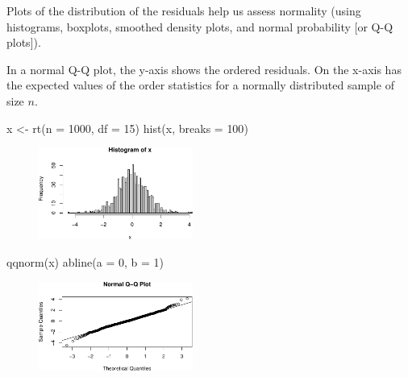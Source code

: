 \documentclass[
  letterpaper,
  DIV=11,
  numbers=noendperiod]{scrreport}
\newenvironment{Shaded}{\begin{snugshade}}{\end{snugshade}}
\newcommand{\AttributeTok}[1]{\textcolor[rgb]{0.40,0.45,0.13}{#1}}
\newcommand{\DecValTok}[1]{\textcolor[rgb]{0.68,0.00,0.00}{#1}}
\newcommand{\FunctionTok}[1]{\textcolor[rgb]{0.28,0.35,0.67}{#1}}
\newcommand{\NormalTok}[1]{\textcolor[rgb]{0.00,0.23,0.31}{#1}}
\newcommand{\OtherTok}[1]{\textcolor[rgb]{0.00,0.23,0.31}{#1}}
\begin{document}
Plots of the distribution of the residuals help us assess normality
(using histograms, boxplots, smoothed density plots, and normal
probability {[}or Q-Q plots{]}).

In a normal Q-Q plot, the y-axis shows the ordered residuals. On the
x-axis has the expected values of the order statistics for a normally
distributed sample of size \(n\).

\begin{Shaded}
\begin{Highlighting}[]
\NormalTok{x }\OtherTok{\textless{}{-}} \FunctionTok{rt}\NormalTok{(}\AttributeTok{n =} \DecValTok{1000}\NormalTok{, }\AttributeTok{df =} \DecValTok{15}\NormalTok{)}
\FunctionTok{hist}\NormalTok{(x, }\AttributeTok{breaks =} \DecValTok{100}\NormalTok{)}
\end{Highlighting}
\end{Shaded}

\begin{figure}[H]

{\centering \includegraphics[width=0.45\textwidth,height=\textheight]{week4/week4_files/figure-pdf/unnamed-chunk-3-1.pdf}

}

\end{figure}

\begin{Shaded}
\begin{Highlighting}[]
\FunctionTok{qqnorm}\NormalTok{(x)}
\FunctionTok{abline}\NormalTok{(}\AttributeTok{a =} \DecValTok{0}\NormalTok{, }\AttributeTok{b =} \DecValTok{1}\NormalTok{)}
\end{Highlighting}
\end{Shaded}

\begin{figure}[H]

{\centering \includegraphics[width=0.45\textwidth,height=\textheight]{week4/week4_files/figure-pdf/unnamed-chunk-3-2.pdf}

}

\end{figure}
\end{document}
